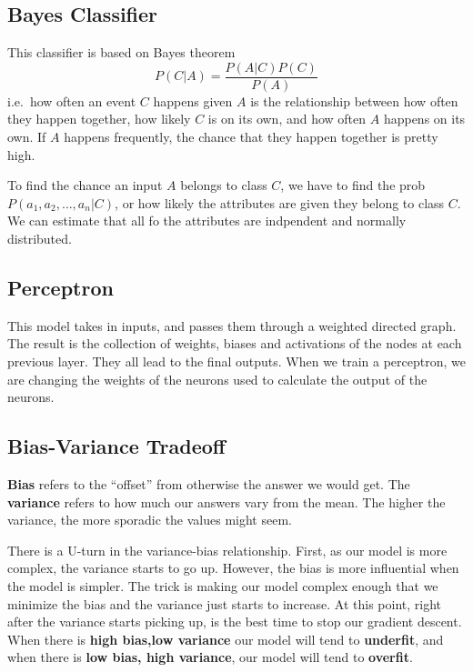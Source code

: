 \documentclass[
  paper=a4,
,captions=tableheading
]{scrartcl}
\begin{document}
\hypertarget{bayes-classifier}{%
\subsection{Bayes Classifier}\label{bayes-classifier}}

This classifier is based on Bayes theorem \begin{equation}
    P(C|A) = \frac{P(A|C)P(C)}{P(A)}
\end{equation} i.e.~how often an event \(C\) happens given \(A\) is the
relationship between how often they happen together, how likely \(C\) is
on its own, and how often \(A\) happens on its own. If \(A\) happens
frequently, the chance that they happen together is pretty high.

To find the chance an input \(A\) belongs to class \(C\), we have to
find the prob \(P(a_{1}, a_{2}, \dots,a_{n}|C)\), or how likely the
attributes are given they belong to class \(C\). We can estimate that
all fo the attributes are indpendent and normally distributed.

\hypertarget{perceptron}{%
\subsection{Perceptron}\label{perceptron}}

This model takes in inputs, and passes them through a weighted directed
graph. The result is the collection of weights, biases and activations
of the nodes at each previous layer. They all lead to the final outputs.
When we train a perceptron, we are changing the weights of the neurons
used to calculate the output of the neurons.

\hypertarget{bias-variance-tradeoff}{%
\subsection{Bias-Variance Tradeoff}\label{bias-variance-tradeoff}}

\textbf{Bias} refers to the ``offset'' from otherwise the answer we
would get. The \textbf{variance} refers to how much our answers vary
from the mean. The higher the variance, the more sporadic the values
might seem.

There is a U-turn in the variance-bias relationship. First, as our model
is more complex, the variance starts to go up. However, the bias is more
influential when the model is simpler. The trick is making our model
complex enough that we minimize the bias and the variance just starts to
increase. At this point, right after the variance starts picking up, is
the best time to stop our gradient descent. When there is \textbf{high
bias,low variance} our model will tend to \textbf{underfit}, and when
there is \textbf{low bias, high variance}, our model will tend to
\textbf{overfit}.
\end{document}
